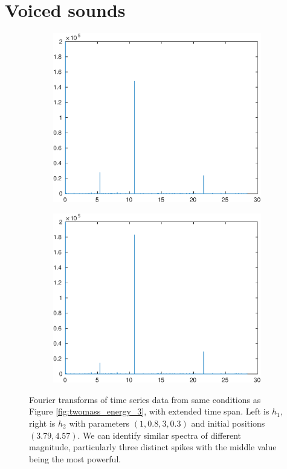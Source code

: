 \documentclass{report}
\begin{document}
\section{Voiced sounds}

\begin{figure}
	\begin{subfigure}[b]{0.5\textwidth}
		\includegraphics[width=\textwidth]{voiced_sounds/case_1/most_stable_resulta.eps}
	\end{subfigure}
	\begin{subfigure}[b]{0.5\textwidth}
		\includegraphics[width=\textwidth]{voiced_sounds/case_1/most_stable_resultb.eps}
	\end{subfigure}
	\caption{
		Fourier transforms of time series data from same conditions as Figure \ref{fig:twomass_energy_3}, with extended time span.
		Left is $h_1$, right is $h_2$ with parameters \((1, 0.8, 3, 0.3)\) and initial positions $(3.79,4.57)$.
		We can identify similar spectra of different magnitude,
		particularly three distinct spikes with the middle value being the most powerful.
	}
	\label{fig:twomass_fourier_first}
\end{figure} %
\end{document}
